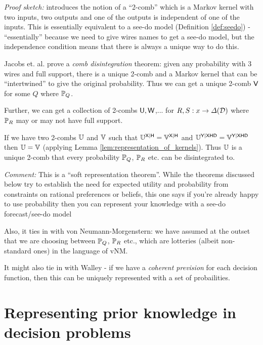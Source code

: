 \emph{Proof sketch:} \citet{jacobs_causal_2019} introduces the notion of a ``2-comb'' which is a Markov kernel with two inputs, two outputs and one of the outputs is independent of one of the inputs. This is essentially equivalent to a see-do model (Definition \ref{def:seedo}) - ``essentially'' because we need to give wires names to get a see-do model, but the independence condition means that there is always a unique way to do this.

Jacobs et. al. prove a \emph{comb disintegration} theorem: given any probability with 3 wires and full support, there is a unique 2-comb and a Markov kernel that can be ``intertwined'' to give the original probability. Thus we can get a unique 2-comb $\mathsf{V}$ for some $Q$ where $\mathbb{P}_Q$.

Further, we can get a collection of 2-combs $\mathsf{U},\mathsf{W}$,... for $R, S:x\to \Delta(\mathcal{D})$ where $\mathbb{P}_R$ may or may not have full support.

If we have two 2-combs $\mathbb{U}$ and $\mathbb{V}$ such that $\mathbb{U}^{\mathsf{X}|\mathsf{H}}=\mathbb{V}^{\mathsf{X}|\mathsf{H}}$ and $\mathbb{U}^{\mathsf{Y}|\mathsf{X}\mathsf{H}\mathsf{D}}=\mathbb{V}^{\mathsf{Y}|\mathsf{X}\mathsf{H}\mathsf{D}}$ then $\mathbb{U}=\mathbb{V}$ (applying Lemma \ref{lem:representation_of_kernels}). Thus $\mathbb{U}$ is a unique 2-comb that every probability $\mathbb{P}_Q$, $\mathbb{P}_R$ etc. can be disintegrated to.


\emph{Comment:} This is a ``soft representation theorem''. While the theorems discussed below try to establish the need for expected utility and probability from constraints on rational preferences or beliefs, this one says if you're already happy to use probability then you can represent your knowledge with a see-do forecast/see-do model

Also, it ties in with von Neumann-Morgenstern: we have assumed at the outset that we are choosing between $\mathbb{P}_Q$, $\mathbb{P}_R$ etc., which are lotteries (albeit non-standard ones) in the language of vNM.

It might also tie in with Walley - if we have a \emph{coherent prevision} for each decision function, then this can be uniquely represented with a set of probailities.


\section{Representing prior knowledge in decision problems}

